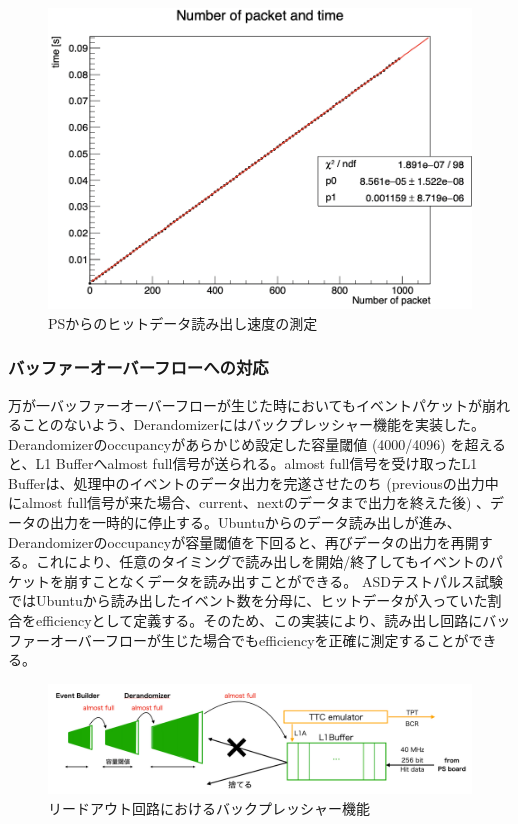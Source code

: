 \baselineskip
\begin{figure} 
\centering
\includegraphics[width=16cm]{fig/QAQC/JTAHubreadspeed.png}
\caption[PSからのヒットデータ読み出し速度の測定]{PSからのヒットデータ読み出し速度の測定}
\label{JTAHubreadspeed}
\end{figure}

\subsubsection{バッファーオーバーフローへの対応} \par
万が一バッファーオーバーフローが生じた時においてもイベントパケットが崩れることのないよう、Derandomizerにはバックプレッシャー機能を実装した。Derandomizerのoccupancyがあらかじめ設定した容量閾値 (4000/4096) を超えると、L1 Bufferへalmost full信号が送られる。almost full信号を受け取ったL1 Bufferは、処理中のイベントのデータ出力を完遂させたのち (previousの出力中にalmost full信号が来た場合、current、nextのデータまで出力を終えた後) 、データの出力を一時的に停止する。Ubuntuからのデータ読み出しが進み、Derandomizerのoccupancyが容量閾値を下回ると、再びデータの出力を再開する。これにより、任意のタイミングで読み出しを開始/終了してもイベントのパケットを崩すことなくデータを読み出すことができる。
ASDテストパルス試験ではUbuntuから読み出したイベント数を分母に、ヒットデータが入っていた割合をefficiencyとして定義する。そのため、この実装により、読み出し回路にバッファーオーバーフローが生じた場合でもefficiencyを正確に測定することができる。
\baselineskip

\begin{figure} 
\centering
\includegraphics[width=16cm]{fig/QAQC/JATHubbackpressure.png}
\caption[リードアウト回路におけるバックプレッシャー機能]{リードアウト回路におけるバックプレッシャー機能}
\label{JATHubbackpressure}
\end{figure}

